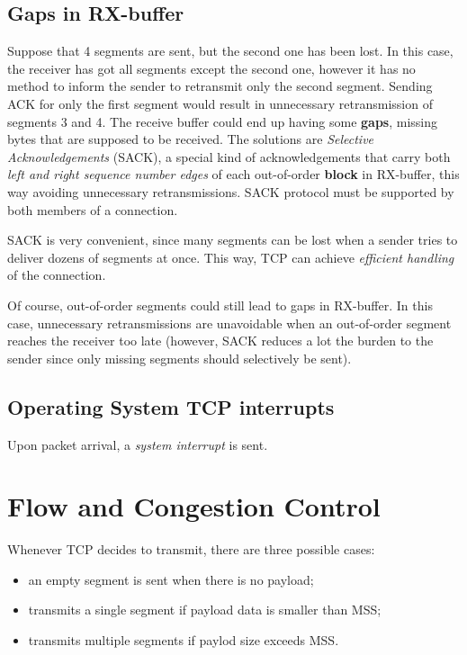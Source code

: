 \documentclass[a4paper, 11pt]{report}
\begin{document}
\section{Gaps in RX-buffer}

Suppose that 4 segments are sent, but the second one has been lost. In this
case, the receiver has got all segments except the second one, however it has
no method to inform the sender to retransmit only the second segment. Sending
ACK for only the first segment would result in unnecessary retransmission of
segments 3 and 4. The receive buffer could end up having some \textbf{gaps},
missing bytes that are supposed to be received. The solutions are
\emph{Selective Acknowledgements} (SACK), a special kind of acknowledgements
that carry both \emph{left and right sequence number edges} of each
out-of-order \textbf{block} in RX-buffer, this way avoiding unnecessary
retransmissions. SACK protocol must be supported by both members of a
connection.

SACK is very convenient, since many segments can be lost when a sender tries to
deliver dozens of segments at once. This way, TCP can achieve \emph{efficient
handling} of the connection.

Of course, out-of-order segments could still lead to gaps in RX-buffer. In this
case, unnecessary retransmissions are unavoidable when an out-of-order segment
reaches the receiver too late (however, SACK reduces a lot the burden to the
sender since only missing segments should selectively be sent).

\section{Operating System TCP interrupts}

Upon packet arrival, a \emph{system interrupt} is sent. 

\chapter{Flow and Congestion Control}

Whenever TCP decides to transmit, there are three possible cases: 
\begin{itemize}
	\item an empty segment is sent when there is no payload;
	\item transmits a single segment if payload data is smaller than MSS;
	\item transmits multiple segments if paylod size exceeds MSS.
\end{itemize}
\end{document}
